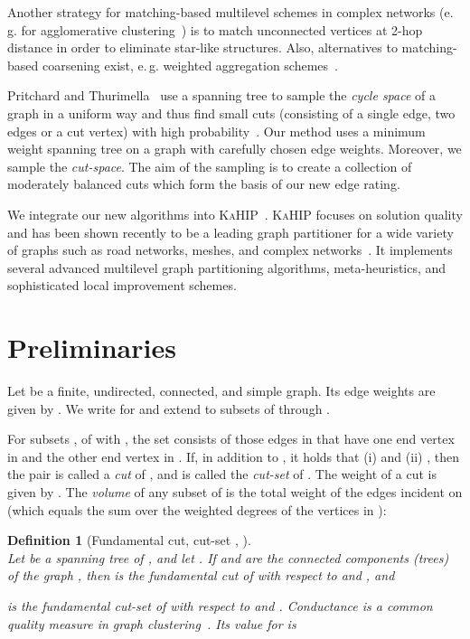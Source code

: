 \documentclass[pdftex]{llncs}
\newcommand{\eg}{e.\,g.\xspace}
\newtheorem{consDefinition}[example]{Definition}
\newcommand{\kahip}{\textsc{KaHIP}\xspace}
\numberwithin{equation}{section}
\numberwithin{example}{section}
\numberwithin{table}{section}
\begin{document}
Another strategy for matching-based multilevel schemes in complex networks 
(\eg for agglomerative clustering~\cite{Fagginger:2013gc}) is to match unconnected
vertices at 2-hop distance in order to eliminate star-like structures.
Also, alternatives to matching-based coarsening exist, \eg
weighted aggregation schemes~\cite{ChevalierS09comparison,MeyerhenkeMS09graph}.






Pritchard and Thurimella~\cite{Pritchard2011a} use a spanning tree to
sample the {\em cycle space} of a graph in a uniform way and thus find
small cuts (consisting of a single edge, two edges or a cut vertex)
with high probability~\cite{Pritchard2011a}. Our method uses a minimum
weight spanning tree on a graph with carefully chosen edge weights. Moreover,
we sample the {\em cut-space}. The aim of the
sampling is to create a collection  of moderately balanced
cuts which form the basis of our new edge rating.



We integrate our new algorithms into \kahip~\cite{kaHIPHomePage,sandersschulz2013}.
\kahip focuses on solution quality and has been shown recently to be
a leading graph partitioner for a wide variety of graphs such as
road networks, meshes, and complex networks~\cite{dissSchulz}.
It implements several advanced multilevel graph partitioning
algorithms, meta-heuristics, and sophisticated local improvement schemes.




\section{Preliminaries}
\label{sec:prelim}
Let  be a finite, undirected, connected, and simple
graph. Its edge weights are given by . We
write  for  and extend  to
subsets of  through .

For subsets ,  of  with , the
set  consists of those edges in  that have one end
vertex in  and the other end vertex in . If, in addition to
, it holds that (i)  and
(ii) , then the pair  is called a
{\em cut} of , and  is called the {\em cut-set} of
. The weight of a cut  is given by
. The \emph{volume} of any subset  of  is
the total weight of the edges incident on  (which equals the sum over the
weighted degrees of the vertices in ):



\begin{consDefinition}[Fundamental cut, cut-set , ]~\\
\label{nota:funda_condu}
\noindent Let  be a spanning tree of , and let . If  and  are the connected components (trees) of the
graph , then  is the
fundamental cut of  with respect to  and , and



\noindent is the fundamental cut-set of  with respect to  and
. Conductance is a common quality measure in graph
clustering~\cite{Kannan04clustering}. Its value for  is



\end{consDefinition}
\end{document}
